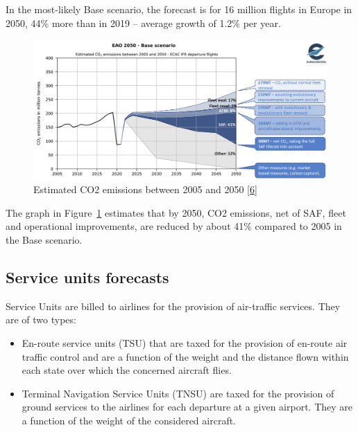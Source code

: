 \documentclass[
  11pt,
  a4paper,
]{book}
\begin{document}
In the most-likely Base scenario, the forecast is for 16 million flights
in Europe in 2050, 44\% more than in 2019 -- average growth of 1.2\% per
year.

\begin{figure}

{\centering \includegraphics{./figures/eao_2050_base_scenario.png}

}

\caption{\label{fig-co2-emissions-plot}Estimated CO2 emissions between
2005 and 2050 \protect\hyperlink{ref-aviation:outlook2022}{{[}6{]}}}

\end{figure}

The graph in Figure~\ref{fig-co2-emissions-plot} estimates that by 2050,
CO2 emissions, net of SAF, fleet and operational improvements, are
reduced by about 41\% compared to 2005 in the Base scenario.

\hypertarget{service-units-forecasts}{%
\subsection{Service units forecasts}\label{service-units-forecasts}}

Service Units are billed to airlines for the provision of air-traffic
services. They are of two types:

\begin{itemize}
\item
  En-route service units (TSU) that are taxed for the provision of
  en-route air traffic control and are a function of the weight and the
  distance flown within each state over which the concerned aircraft
  flies.
\item
  Terminal Navigation Service Units (TNSU) are taxed for the provision
  of ground services to the airlines for each departure at a given
  airport. They are a function of the weight of the considered aircraft.
\end{itemize}
\end{document}
